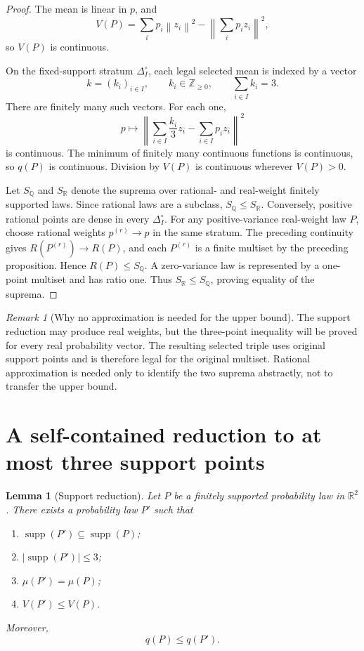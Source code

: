 \documentclass[11pt]{article}
\newtheorem{lemma}[theorem]{Lemma}
\theoremstyle{definition}
\theoremstyle{remark}
\newtheorem{remark}[theorem]{Remark}
\newcommand{\R}{\mathbb{R}}
\newcommand{\supp}{\operatorname{supp}}
\newcommand{\norm}[1]{\left\lVert #1\right\rVert}
\begin{document}
\begin{proof}
The mean is linear in $p$, and
\begin{equation}
V(P)=\sum_i p_i\norm{z_i}^2-\norm{\sum_i p_i z_i}^2,
\label{eq:variance-second-moment}
\end{equation}
so $V(P)$ is continuous.

On the fixed-support stratum $\Delta_I^\circ$, each legal selected mean is indexed by a vector
\[
k=(k_i)_{i\in I},\qquad k_i\in\mathbb Z_{\ge0},\qquad \sum_{i\in I}k_i=3.
\]
There are finitely many such vectors.  For each one,
\[
p\longmapsto
\norm{\sum_{i\in I}\frac{k_i}{3}z_i-\sum_{i\in I}p_i z_i}^2
\]
is continuous.  The minimum of finitely many continuous functions is continuous, so $q(P)$ is continuous.  Division by $V(P)$ is continuous wherever $V(P)>0$.

Let $S_{\mathbb Q}$ and $S_{\mathbb R}$ denote the suprema over rational- and real-weight finitely supported laws.  Since rational laws are a subclass, $S_{\mathbb Q}\le S_{\mathbb R}$.  Conversely, positive rational points are dense in every $\Delta_I^\circ$.  For any positive-variance real-weight law $P$, choose rational weights $p^{(r)}\to p$ in the same stratum.  The preceding continuity gives $R(P^{(r)})\to R(P)$, and each $P^{(r)}$ is a finite multiset by the preceding proposition.  Hence $R(P)\le S_{\mathbb Q}$.  A zero-variance law is represented by a one-point multiset and has ratio one.  Thus $S_{\mathbb R}\le S_{\mathbb Q}$, proving equality of the suprema.
\end{proof}

\begin{remark}[Why no approximation is needed for the upper bound]
The support reduction may produce real weights, but the three-point inequality will be proved for every real probability vector.  The resulting selected triple uses original support points and is therefore legal for the original multiset.  Rational approximation is needed only to identify the two suprema abstractly, not to transfer the upper bound.
\end{remark}

\section{A self-contained reduction to at most three support points}

\begin{lemma}[Support reduction]
Let $P$ be a finitely supported probability law in $\R^2$.  There exists a probability law $P'$ such that
\begin{enumerate}[label=(\roman*)]
\item $\supp(P')\subseteq\supp(P)$;
\item $|\supp(P')|\le3$;
\item $\mu(P')=\mu(P)$;
\item $V(P')\le V(P)$.
\end{enumerate}
Moreover,
\begin{equation}
q(P)\le q(P').
\label{eq:q-support-direction}
\end{equation}
\end{lemma}
\end{document}
